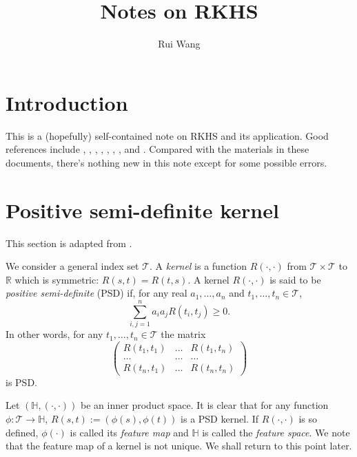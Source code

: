 \documentclass[11pt]{article}
\title{Notes on RKHS}
\author{Rui Wang}
\theoremstyle{plain}
\theoremstyle{definition}
\theoremstyle{remark}
\begin{document}
\maketitle
\section{Introduction}
This is a (hopefully) self-contained note on RKHS and its application.
Good references include \cite{book:1273182}, \cite{book:982265}, \cite{hofmann2008}, \cite{book:274797}, \cite{book:274797}, \cite{914517}, \cite{vandervaart}, \cite{Amini2013High} and \cite{book:1323324}.
Compared with the materials in these documents, there's nothing new in this note except for some possible errors.



\section{Positive semi-definite kernel}
This section is adapted from \cite{hofmann2008}.

We consider a general index set $\mathcal{T}$.
A \emph {kernel} is a function $R(\cdot,\cdot)$ from $\mathcal{T}\times \mathcal{T}$ to $\mathbb{R}$ which is symmetric: $R(s,t)=R(t,s)$.
A kernel $R(\cdot,\cdot)$ is said to be \emph{positive semi-definite} (PSD) if, for any real $a_1,\ldots,a_n$ and $t_1,\ldots, t_n \in \mathcal{T}$,
\begin{equation*}
    \sum_{i,j=1}^n a_i a_j R(t_i,t_j)\geq 0.
\end{equation*}
In other words, for any $t_1,\ldots,t_n \in \mathcal{T}$ the matrix
\begin{equation*}
    \begin{pmatrix}
        R(t_1,t_1) & \ldots & R(t_1,t_n)\\
        \ldots& \ldots & \ldots\\
        R(t_n,t_1) & \ldots & R(t_n,t_n)
    \end{pmatrix}
\end{equation*}
is PSD.

Let $(\mathbb H, (\cdot,\cdot))$ be an inner product space.
It is clear that for any function $\phi:\mathcal T \to \mathbb H$, $R(s,t):=(\phi(s),  \phi(t))$ is a PSD kernel.
If $R(\cdot,\cdot)$ is so defined, $\phi(\cdot)$ is called its \emph{feature map} and  $\mathbb H$ is called the \emph{feature space}.
We note that the feature map of a kernel is not unique.
We shall return to this point later.
\end{document}
